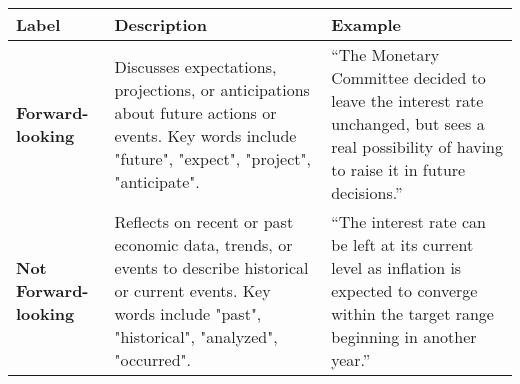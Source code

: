 \begin{table*}
    \caption{}
    \vspace{1em}
    \begin{tabular}{p{}p{}p{}}
    \toprule
    \textbf{Label} & \textbf{Description} & \textbf{Example} \\
    \midrule
    \textbf{Forward-looking} & Discusses expectations, projections, or anticipations about future actions or events. Key words include "future", "expect", "project", "anticipate". & “The Monetary Committee decided to leave the interest rate unchanged, but sees a real possibility of having to raise it in future decisions.” \\
    \midrule
    \textbf{Not Forward-looking} & Reflects on recent or past economic data, trends, or events to describe historical or current events. Key words include "past", "historical", "analyzed", "occurred". & “The interest rate can be left at its current level as inflation is expected to converge within the target range beginning in another year.” \\
    \bottomrule
    \end{tabular}
    \label{tb:boi_forward_looking_guide}
\end{table*}